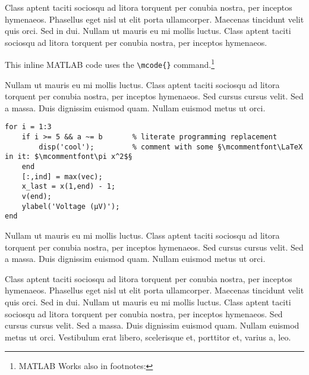 Class aptent taciti sociosqu ad litora torquent per conubia nostra, per inceptos hymenaeos. Phasellus eget nisl ut elit porta ullamcorper. Maecenas tincidunt velit quis orci. Sed in dui. Nullam ut mauris eu mi mollis luctus. Class aptent taciti sociosqu ad litora torquent per conubia nostra, per inceptos hymenaeos.

This inline MATLAB code  uses the \verb|\mcode{}| command.\footnote{MATLAB Works also in footnotes: }

Nullam ut mauris eu mi mollis luctus. Class aptent taciti sociosqu ad litora torquent per conubia nostra, per inceptos hymenaeos. Sed cursus cursus velit. Sed a massa. Duis dignissim euismod quam. Nullam euismod metus ut orci.

\begin{lstlisting}[language=matlabfloz,caption={\mcode{Matlab Function}}]
for i = 1:3
	if i >= 5 && a ~= b       % literate programming replacement
		disp('cool');         % comment with some §\mcommentfont\LaTeX in it: $\mcommentfont\pi x^2$§
	end
	[:,ind] = max(vec);
	x_last = x(1,end) - 1;
	v(end);
	ylabel('Voltage (µV)');
end
\end{lstlisting}

Nullam ut mauris eu mi mollis luctus. Class aptent taciti sociosqu ad litora torquent per conubia nostra, per inceptos hymenaeos. Sed cursus cursus velit. Sed a massa. Duis dignissim euismod quam. Nullam euismod metus ut orci.



Class aptent taciti sociosqu ad litora torquent per conubia nostra, per inceptos hymenaeos. Phasellus eget nisl ut elit porta ullamcorper. Maecenas tincidunt velit quis orci. Sed in dui. Nullam ut mauris eu mi mollis luctus. Class aptent taciti sociosqu ad litora torquent per conubia nostra, per inceptos hymenaeos. Sed cursus cursus velit. Sed a massa. Duis dignissim euismod quam. Nullam euismod metus ut orci. Vestibulum erat libero, scelerisque et, porttitor et, varius a, leo.

